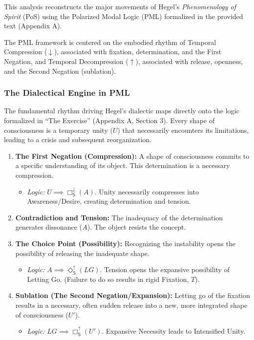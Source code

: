 This analysis reconstructs the major movements of Hegel's \emph{Phenomenology of Spirit} (PoS) using the Polarized Modal Logic (PML) formalized in the provided text (Appendix A).

The PML framework is centered on the embodied rhythm of Temporal Compression (\(\downarrow\)), associated with fixation, determination, and the First Negation, and Temporal Decompression (\(\uparrow\)), associated with release, openness, and the Second Negation (sublation).

\subsubsection{The Dialectical Engine in PML}\label{the-dialectical-engine-in-pml}

The fundamental rhythm driving Hegel's dialectic maps directly onto the logic formalized in ``The Exercise'' (Appendix A, Section 3). Every shape of consciousness is a temporary unity (\(U\)) that necessarily encounters its limitations, leading to a crisis and subsequent reorganization.

\begin{enumerate}
\def\labelenumi{\arabic{enumi}.}
\tightlist
\item
  \textbf{The First Negation (Compression):} A shape of consciousness commits to a specific understanding of its object. This determination is a necessary compression.

  \begin{itemize}
  \tightlist
  \item
    \emph{Logic:} \(U \implies \Box_{\mathsf{S}}^{\downarrow}(A)\). Unity necessarily compresses into Awareness/Desire, creating determination and tension.
  \end{itemize}
\item
  \textbf{Contradiction and Tension:} The inadequacy of the determination generates dissonance (\(A\)). The object resists the concept.
\item
  \textbf{The Choice Point (Possibility):} Recognizing the instability opens the possibility of releasing the inadequate shape.

  \begin{itemize}
  \tightlist
  \item
    \emph{Logic:} \(A \implies \Diamond_{\mathsf{S}}^{\uparrow}(LG)\). Tension opens the expansive possibility of Letting Go. (Failure to do so results in rigid Fixation, \(T\)).
  \end{itemize}
\item
  \textbf{Sublation (The Second Negation/Expansion):} Letting go of the fixation results in a necessary, often sudden release into a new, more integrated shape of consciousness (\(U'\)).

  \begin{itemize}
  \tightlist
  \item
    \emph{Logic:} \(LG \implies \Box_{\mathsf{S}}^{\uparrow}(U')\). Expansive Necessity leads to Intensified Unity.
  \end{itemize}
\end{enumerate}

